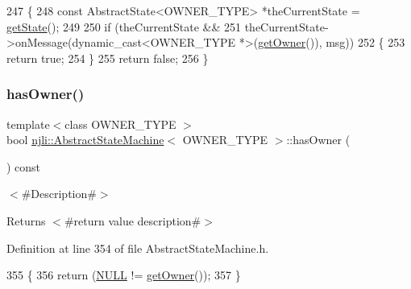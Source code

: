\begin{DoxyCode}
247   \{
248     \textcolor{keyword}{const} AbstractState<OWNER\_TYPE> *theCurrentState = \mbox{\hyperlink{classnjli_1_1_abstract_state_machine_a026a33bc918f423304b442e0dfaa046e}{getState}}();
249 
250     \textcolor{keywordflow}{if} (theCurrentState &&
251         theCurrentState->onMessage(dynamic\_cast<OWNER\_TYPE *>(\mbox{\hyperlink{classnjli_1_1_abstract_state_machine_aabf808253d72265695e03c299a434798}{getOwner}}()), msg))
252       \{
253         \textcolor{keywordflow}{return} \textcolor{keyword}{true};
254       \}
255     \textcolor{keywordflow}{return} \textcolor{keyword}{false};
256   \}
\end{DoxyCode}
\mbox{\label{classnjli_1_1_abstract_state_machine_a5e4cb433301c576d640fff966b2c87eb}} 
\subsubsection{\texorpdfstring{has\+Owner()}{hasOwner()}}
{\footnotesize\ttfamily template$<$class O\+W\+N\+E\+R\+\_\+\+T\+Y\+PE $>$ \\
bool \mbox{\hyperlink{classnjli_1_1_abstract_state_machine}{njli\+::\+Abstract\+State\+Machine}}$<$ O\+W\+N\+E\+R\+\_\+\+T\+Y\+PE $>$\+::has\+Owner (\begin{DoxyParamCaption}{ }\end{DoxyParamCaption}) const\hspace{0.3cm}{\ttfamily [virtual]}}

$<$\#\+Description\#$>$

\begin{DoxyReturn}{Returns}
$<$\#return value description\#$>$ 
\end{DoxyReturn}


Definition at line 354 of file Abstract\+State\+Machine.\+h.


\begin{DoxyCode}
355   \{
356     \textcolor{keywordflow}{return} (\mbox{\hyperlink{_abstract_state_8h_a070d2ce7b6bb7e5c05602aa8c308d0c4}{NULL}} != \mbox{\hyperlink{classnjli_1_1_abstract_state_machine_aabf808253d72265695e03c299a434798}{getOwner}}());
357   \}
\end{DoxyCode}
\mbox{\label{classnjli_1_1_abstract_state_machine_af5d1c414f2ac3aba89c076461b404271}} 

